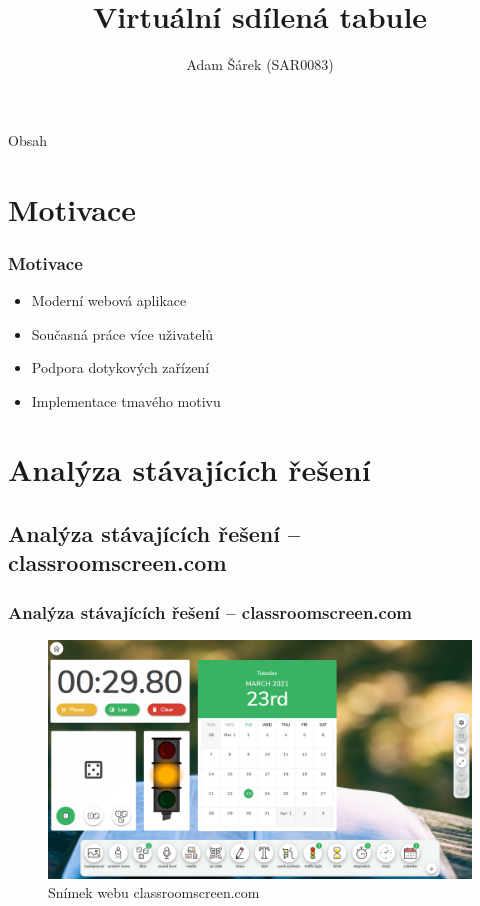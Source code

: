 \documentclass{beamer}
\title{Virtuální sdílená tabule}
\author{Adam Šárek (SAR0083)}
\begin{document}
\begin{frame}
    \titlepage
\end{frame}

\begin{frame}{Obsah}
    \tableofcontents
\end{frame}



\section{Motivace}
\begin{frame}
    \frametitle{Motivace}
    \begin{itemize}
        \item Moderní webová aplikace
        \item Současná práce více uživatelů
        \item Podpora dotykových zařízení
        \item Implementace tmavého motivu
    \end{itemize}
\end{frame}



\section{Analýza stávajících řešení}
\subsection{Analýza stávajících řešení -- classroomscreen.com}
\begin{frame}
    \frametitle{Analýza stávajících řešení -- classroomscreen.com}
    \begin{figure}
        \centering
        \includegraphics[width=1\textwidth]{Figures/classroomscreen.png}
        \caption{Snímek webu classroomscreen.com}
    \end{figure}
\end{frame}
\end{document}
